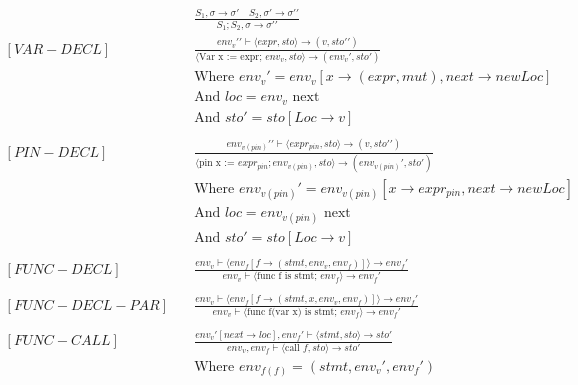 \begin{align*}
    [COMPOSITION] \quad  &
    \frac
    {S_1, \sigma \rightarrow \sigma \prime \quad S_2, \sigma \prime \rightarrow \sigma \prime \prime}
    {S_1;S_2, \sigma \rightarrow \sigma \prime \prime}
    \\
    [VAR-DECL]     \quad &
    \frac
    {env_v\prime \prime \vdash\langle expr, sto\rangle\to (v, sto\prime \prime)}
    {\langle\text{Var x := expr; }env_v,sto\rangle \to (env_v\prime, sto\prime)} \\
                         & \text{Where } env_v\prime = env_v[x \to (expr, mut), next \to new Loc]                                               \\
                         & \text{And } loc = env_v \text{ next}                               \\
                         & \text{And } sto\prime = sto[Loc \to v]
    \\
    \\
    [PIN-DECL] \quad     &
    \frac
    {env_{v(pin)}\prime \prime \vdash\langle expr_{pin}, sto\rangle\to (v, sto\prime \prime)}
    {\langle\text{pin x := }expr_{pin}; env_{v(pin)}, sto \rangle \to (env_{v(pin)}\prime, sto\prime)} \\
                         & \text{Where } env_{v(pin)}\prime = env_{v(pin)}[x \to expr_{pin}, next \to new Loc]   \\
                         & \text{And }loc = env_{v(pin)} \text{ next}   \\
                         & \text{And }sto\prime = sto[Loc \to v]
    \\
    \\
    [FUNC-DECL] \quad &
    \frac
    {env_v\vdash\langle env_f[f \to (stmt, env_v, env_f)]\rangle \to env_f \prime}
    {env_v \vdash \langle \text{func f is stmt; } env_f \rangle \to env_f\prime} 
    \\
    \\
    [FUNC-DECL-PAR] \quad &
    \frac
    {env_v\vdash\langle env_f[f \to (stmt, x, env_v, env_f)]\rangle \to env_f \prime}
    {env_v \vdash \langle \text{func f(var x) is stmt; } env_f \rangle \to env_f \prime}
    \\
    \\
    [FUNC-CALL] \quad &
    \frac
    {env_v\prime [next \to loc], env_f\prime \vdash \langle stmt, sto \rangle \to sto\prime}
    {env_v, env_f \vdash \langle \text{call }f, sto\rangle \to sto\prime}
    \\ & \text{Where }env_{f(f)} = (stmt, env_v\prime, env_f\prime) \\

\end{align*}
